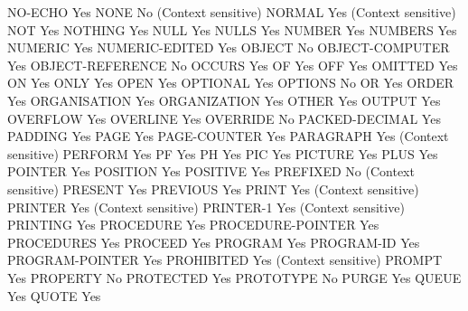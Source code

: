 NO-ECHO                         Yes
NONE                            No (Context sensitive)
NORMAL                          Yes (Context sensitive)
NOT                             Yes
NOTHING                         Yes
NULL                            Yes
NULLS                           Yes
NUMBER                          Yes
NUMBERS                         Yes
NUMERIC                         Yes
NUMERIC-EDITED                  Yes
OBJECT                          No
OBJECT-COMPUTER                 Yes
OBJECT-REFERENCE                No
OCCURS                          Yes
OF                              Yes
OFF                             Yes
OMITTED                         Yes
ON                              Yes
ONLY                            Yes
OPEN                            Yes
OPTIONAL                        Yes
OPTIONS                         No
OR                              Yes
ORDER                           Yes
ORGANISATION                    Yes
ORGANIZATION                    Yes
OTHER                           Yes
OUTPUT                          Yes
OVERFLOW                        Yes
OVERLINE                        Yes
OVERRIDE                        No
PACKED-DECIMAL                  Yes
PADDING                         Yes
PAGE                            Yes
PAGE-COUNTER                    Yes
PARAGRAPH                       Yes (Context sensitive)
PERFORM                         Yes
PF                              Yes
PH                              Yes
PIC                             Yes
PICTURE                         Yes
PLUS                            Yes
POINTER                         Yes
POSITION                        Yes
POSITIVE                        Yes
PREFIXED                        No (Context sensitive)
PRESENT                         Yes
PREVIOUS                        Yes
PRINT                           Yes (Context sensitive)
PRINTER                         Yes (Context sensitive)
PRINTER-1                       Yes (Context sensitive)
PRINTING                        Yes
PROCEDURE                       Yes
PROCEDURE-POINTER               Yes
PROCEDURES                      Yes
PROCEED                         Yes
PROGRAM                         Yes
PROGRAM-ID                      Yes
PROGRAM-POINTER                 Yes
PROHIBITED                      Yes (Context sensitive)
PROMPT                          Yes
PROPERTY                        No
PROTECTED                       Yes
PROTOTYPE                       No
PURGE                           Yes
QUEUE                           Yes
QUOTE                           Yes
